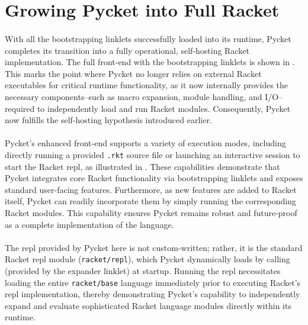 	\section[\texorpdfstring{Growing Pycket into Full Racket}{Pycket as Full Racket}]{Growing Pycket into Full Racket}


		\paragraph{}%
			With all the bootstrapping linklets successfully loaded into its runtime, Pycket completes its transition into a fully operational, self-hosting Racket implementation. The full front-end with the bootstrapping linklets is shown in . This marks the point where Pycket no longer relies on external Racket executables for critical runtime functionality, as it now internally provides the necessary components--such as macro expansion, module handling, and I/O--required to independently load and run Racket modules. Consequently, Pycket now fulfills the self-hosting hypothesis introduced earlier.


		\paragraph{}%
			Pycket's enhanced front-end supports a variety of execution modes, including directly running a provided \texttt{.rkt} source file or launching an interactive session to start the Racket \gls{repl}, as illustrated in . These capabilities demonstrate that Pycket integrates core Racket functionality via bootstrapping linklets and exposes standard user-facing features. Furthermore, as new features are added to Racket itself, Pycket can readily incorporate them by simply running the corresponding Racket modules. This capability ensures Pycket remains robust and future-proof as a complete implementation of the language.

		\paragraph{}%
			The \gls{repl} provided by Pycket here is not custom-written; rather, it is the standard Racket \gls{repl} module (\texttt{racket/repl}), which Pycket dynamically loads by calling  (provided by the expander linklet) at startup. Running the \gls{repl} necessitates loading the entire \texttt{racket/base} language immediately prior to executing Racket’s \gls{repl} implementation, thereby demonstrating Pycket's capability to independently expand and evaluate sophisticated Racket language modules directly within its runtime.

